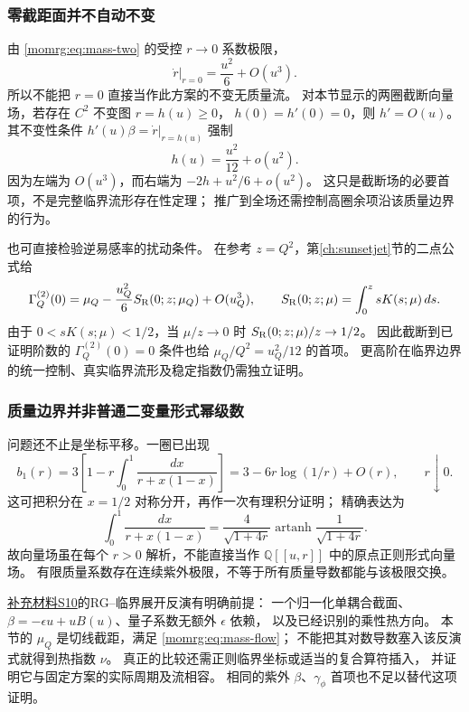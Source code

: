 \documentclass[11pt,a4paper,oneside]{ctexart}
\theoremstyle{cnplain}
\theoremstyle{definition}
\theoremstyle{remark}
\newcommand{\Q}{\mathbb Q}
\numberwithin{equation}{section}
\newcommand{\otherref}[2]{\href{#1.pdf}{#2}}
\begin{document}
\subsubsection{零截距面并不自动不变}
由 \eqref{momrg:eq:mass-two} 的受控 $r\to0$ 系数极限，
\begin{equation}\label{momrg:eq:r-zero}
 \left.\dot r\right|_{r=0}
 =\frac{u^2}{6}+O(u^3).
\end{equation}
所以不能把 $r=0$ 直接当作此方案的不变无质量流。
对本节显示的两圈截断向量场，若存在 $C^2$ 不变图 $r=h(u)\geq0$，
$h(0)=h'(0)=0$，则 $h'=O(u)$。
其不变性条件
$h'(u)\beta=\dot r|_{r=h(u)}$ 强制
\begin{equation}\label{momrg:eq:critical-graph}
 h(u)=\frac{u^2}{12}+o(u^2).
\end{equation}
因为左端为 $O(u^3)$，而右端为 $-2h+u^2/6+o(u^2)$。
这只是截断场的必要首项，不是完整临界流形存在性定理；
推广到全场还需控制高圈余项沿该质量边界的行为。

也可直接检验逆易感率的扰动条件。
在参考 $z=Q^2$，第\ref{ch:sunsetjet}节的二点公式给
\[
 \Gamma_Q^{(2)}(0)=\mu_Q-\frac{u_Q^2}{6}S_{\mathrm R}(0;z;\mu_Q)+O(u_Q^3),
 \qquad
 S_{\mathrm R}(0;z;\mu)=\int_0^z sK(s;\mu)\,ds.
\]
由于 $0<sK(s;\mu)<1/2$，当 $\mu/z\to0$ 时
$S_{\mathrm R}(0;z;\mu)/z\to1/2$。
因此截断到已证明阶数的 $\Gamma_Q^{(2)}(0)=0$ 条件也给
$\mu_Q/Q^2=u_Q^2/12$ 的首项。
更高阶在临界边界的统一控制、真实临界流形及稳定指数仍需独立证明。

\subsubsection{质量边界并非普通二变量形式幂级数}
问题还不止是坐标平移。一圈已出现
\begin{equation}\label{momrg:eq:b1-nonanalytic}
 b_1(r)=3\left[1-r\int_0^1\frac{dx}{r+x(1-x)}\right]
       =3-6r\log(1/r)+O(r),\qquad r\downarrow0.
\end{equation}
这可把积分在 $x=1/2$ 对称分开，再作一次有理积分证明；
精确表达为
\[
 \int_0^1\frac{dx}{r+x(1-x)}
 =\frac4{\sqrt{1+4r}}
       \operatorname{artanh}\frac1{\sqrt{1+4r}}.
\]
故向量场虽在每个 $r>0$ 解析，不能直接当作
$\Q[[u,r]]$ 中的原点正则形式向量场。
有限质量系数存在连续紫外极限，不等于所有质量导数都能与该极限交换。

\otherref{feynman_periods_supplement}{补充材料S10}的RG--临界展开反演有明确前提：
一个归一化单耦合截面、
$\beta=-\epsilon u+uB(u)$、量子系数无额外 $\epsilon$ 依赖，
以及已经识别的乘性热方向。
本节的 $\mu_Q$ 是切线截距，满足 \eqref{momrg:eq:mass-flow}；
不能把其对数导数塞入该反演式就得到热指数 $\nu$。
真正的比较还需正则临界坐标或适当的复合算符插入，
并证明它与固定方案的实际周期及流相容。
相同的紫外 $\beta$、$\gamma_\phi$ 首项也不足以替代这项证明。
\end{document}
